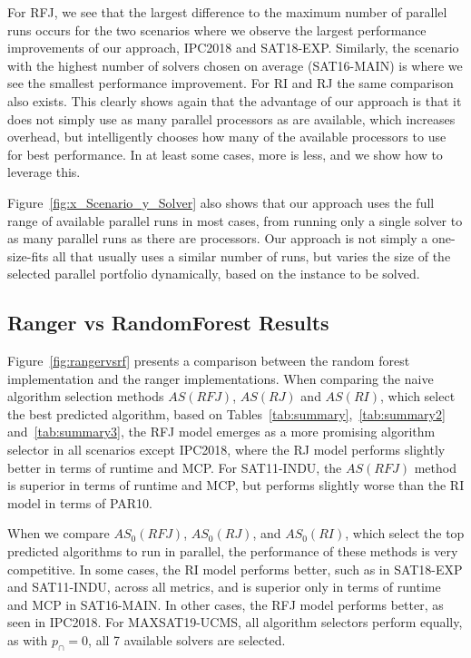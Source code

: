 For RFJ, we see that the largest difference to the maximum number of parallel runs occurs for the two scenarios where we observe the largest performance improvements of our approach, IPC2018 and SAT18-EXP. Similarly, the scenario with the highest number of solvers chosen on average (SAT16-MAIN) is where we see the smallest performance improvement. For RI and RJ the same comparison also exists. This clearly shows again that the advantage of our approach is that it does not simply use as many parallel processors as are available, which increases overhead, but intelligently chooses how many of the available processors to use for best performance. In at least some cases, more is less, and we show how to leverage this.

Figure~\ref{fig:x_Scenario_y_Solver} also shows that our approach uses the full range of available parallel runs in most cases, from running only a single solver to as many parallel runs as there are processors. Our approach is not simply a one-size-fits all that usually uses a similar number of runs, but varies the size of the selected parallel portfolio dynamically, based on the instance to be solved.

\subsection{Ranger vs RandomForest Results}
Figure~\ref{fig:rangervsrf} presents a comparison between the random forest implementation and the ranger implementations. When comparing the naive algorithm selection methods $AS (RFJ)$, $AS (RJ)$ and $AS (RI)$, which select the best predicted algorithm, based on Tables~\ref{tab:summary},~\ref{tab:summary2} and~\ref{tab:summary3}, the RFJ model emerges as a more promising algorithm selector in all scenarios except IPC2018, where the RJ model performs slightly better in terms of runtime and MCP. For SAT11-INDU, the $AS (RFJ)$ method is superior in terms of runtime and MCP, but performs slightly worse than the RI model in terms of PAR10.

When we compare $AS_{0} (RFJ)$, $AS_{0} (RJ)$, and $AS_{0} (RI)$, which select the top predicted algorithms to run in parallel, the performance of these methods is very competitive. In some cases, the RI model performs better, such as in SAT18-EXP and SAT11-INDU, across all metrics, and is superior only in terms of runtime and MCP in SAT16-MAIN. In other cases, the RFJ model performs better, as seen in IPC2018. For MAXSAT19-UCMS, all algorithm selectors perform equally, as with $p_{\cap} = 0$, all 7 available solvers are selected.

